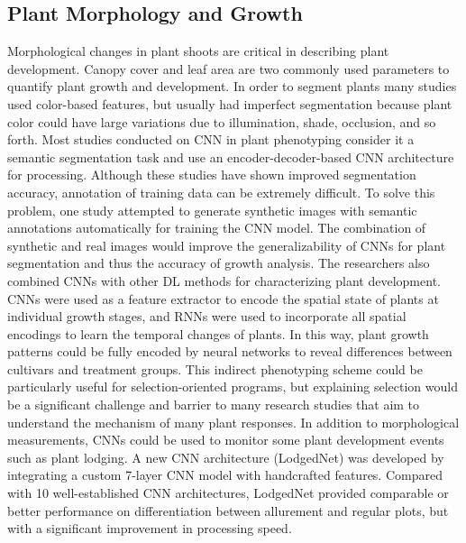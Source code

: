 \subsection{Plant Morphology and Growth}
Morphological changes in plant shoots are critical in describing plant development. Canopy cover and leaf area are two commonly used parameters to quantify plant
growth and development. In order to segment plants many studies used color-based features, but usually had imperfect segmentation because plant color could have large
variations due to illumination, shade, occlusion, and so forth. Most studies conducted on CNN in plant phenotyping consider it a semantic segmentation task and use
an encoder-decoder-based CNN architecture for processing. Although these studies have shown improved segmentation accuracy, annotation of training data can be
extremely difficult. To solve this problem, one study attempted to generate synthetic images with semantic annotations automatically for training the CNN model.
The combination of synthetic and real images would improve the generalizability of CNNs for plant segmentation and thus the accuracy of growth analysis.
The researchers also combined CNNs with other DL methods for characterizing plant development. CNNs were used as a feature extractor to encode the spatial
state of plants at individual growth stages, and RNNs were used to incorporate all spatial encodings to learn the temporal changes of plants. In this way,
plant growth patterns could be fully encoded by neural networks to reveal differences between cultivars and treatment groups. This indirect phenotyping scheme
could be particularly useful for selection-oriented programs, but explaining selection would be a significant challenge and barrier to many research studies that
aim to understand the mechanism of many plant responses. In addition to morphological measurements, CNNs could be used to monitor some plant development events
such as plant lodging. A new CNN architecture (LodgedNet)\cite{mardanisamani2019crop} was developed by integrating a custom 7-layer CNN model with handcrafted features. Compared with
10 well-established CNN architectures, LodgedNet provided comparable or better performance on differentiation between allurement and regular plots, but with a
significant improvement in processing speed.

